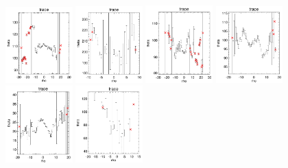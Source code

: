 \documentclass[fleqn,usenatbib]{mnras}
\begin{document}
\begin{figure}
    \centering
    \includegraphics[width=0.23\textwidth]{Images/trace-plots/trace-plots-cpsb-controls/8945-12703.png}
    \includegraphics[width=0.23\textwidth]{Images/trace-plots/trace-plots-cpsb-controls/8992-1902.png}
    \includegraphics[width=0.23\textwidth]{Images/trace-plots/trace-plots-cpsb-controls/8995-9101.png}
    \includegraphics[width=0.23\textwidth]{Images/trace-plots/trace-plots-cpsb-controls/9029-6103.png}
    \includegraphics[width=0.23\textwidth]{Images/trace-plots/trace-plots-cpsb-controls/9043-6104.png}
    \includegraphics[width=0.23\textwidth]{Images/trace-plots/trace-plots-cpsb-controls/9048-6101.png}

\end{figure}
\end{document}

